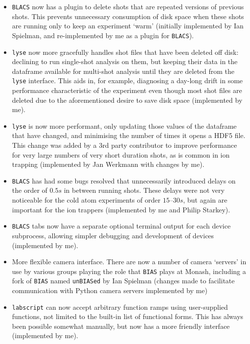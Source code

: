 \begin{itemize}
    \item \texttt{BLACS} now has a plugin to delete shots that are repeated versions of previous shots. This prevents unnecessary consumption of disk space when these shots are running only to keep an experiment `warm' (initially implemented by Ian Spielman, and re-implemented by me as a plugin for \texttt{BLACS}).
    
    \item \texttt{lyse} now more gracefully handles shot files that have been deleted off disk: declining to run single-shot analysis on them, but keeping their data in the dataframe available for multi-shot analysis until they are deleted from the \texttt{lyse} interface. This aids in, for example, diagnosing a day-long drift in some performance characteristic of the experiment even though most shot files are deleted due to the aforementioned desire to save disk space (implemented by me).
    
    \item \texttt{lyse} is now more performant, only updating those values of the dataframe that have changed, and minimising the number of times it opens a HDF5 file. This change was added by a 3rd party contributor to improve performance for very large numbers of very short duration shots, as is common in ion trapping (implemented by Jan Werkmann with changes by me).
    
    \item \texttt{BLACS} has had some bugs resolved that unnecessarily introduced delays on the order of $0.5\unit{s}$ in between running shots. These delays were not very noticeable for the cold atom experiments of order $15\textrm{--}30\unit{s}$, but again are important for the ion trappers (implemented by me and Philip Starkey).
    
    \item \texttt{BLACS} tabs now have a separate optional terminal output for each device subprocess, allowing simpler debugging and development of devices (implemented by me).
    
    \item More flexible camera interface. There are now a number of camera `servers' in use by various groups playing the role that \texttt{BIAS} plays at Monash, including a fork of \texttt{BIAS} named \texttt{unBIASed} by Ian Spielman (changes made to facilitate communication with Python camera servers implemented by me)
    
    \item \texttt{labscript} can now accept arbitrary function ramps using user-supplied functions, not limited to the built-in list of functional forms. This has always been possible somewhat manually, but now has a more friendly interface (implemented by me).
    

\end{itemize}
